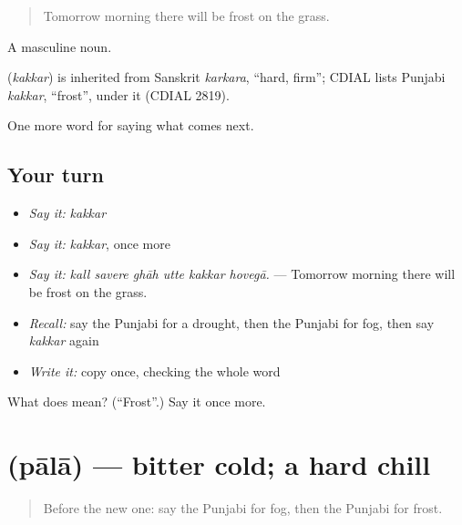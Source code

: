 \begin{quote}
Tomorrow morning there will be frost on the grass.
\end{quote}

A masculine noun.

\begin{cousinweb}
\textbf{} (\emph{kakkar}) is inherited from Sanskrit \emph{karkara}, \textquotedblleft{}hard, firm\textquotedblright{}; CDIAL lists Punjabi \emph{kakkar}, \textquotedblleft{}frost\textquotedblright{}, under it (CDIAL 2819).
\end{cousinweb}

\begin{grammarlens}[title={What you've built}]
One more word for saying what comes next.
\end{grammarlens}

\subsection*{Your turn}
\begin{itemize}
\raggedright
  \item \emph{Say it:} \emph{kakkar}
  \item \emph{Say it:} \emph{kakkar}, once more
  \item \emph{Say it:} \emph{kall savere ghāh utte kakkar hovegā.} — Tomorrow morning there will be frost on the grass.
  \item \emph{Recall:} say the Punjabi for a drought, then the Punjabi for fog, then say \emph{kakkar} again
  \item \emph{Write it:} copy \textbf{} once, checking the whole word
\end{itemize}

\begin{tcolorbox}[breakable,colback=teal!4,colframe=teal!35!black,title={Before you move on}]
What does  mean? (\textquotedblleft{}Frost\textquotedblright{}.) Say it once more.
\end{tcolorbox}
\section[\texorpdfstring{\pa{ਪਾਲਾ} (pālā)}{ਪਾਲਾ (pālā)}]{ (pālā) — bitter cold; a hard chill}

\label{lesson:PA-C289-pala}



\begin{quote}
Before the new one: say the Punjabi for fog, then the Punjabi for frost.
\end{quote}

